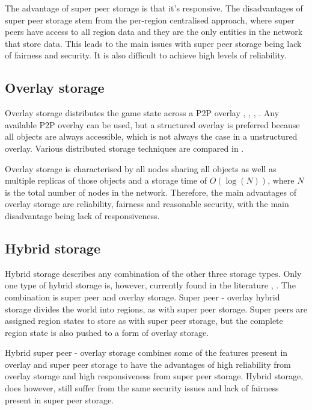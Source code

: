\documentclass[10pt,a4paper,conference]{IEEEtran}
\begin{document}
The advantage of super peer storage is that it's responsive. The disadvantages of super peer storage stem from the per-region centralised approach,
where super peers have access to all region data and they are the only entities in the network that store data. This leads to the main issues with
super peer storage being lack of fairness and security. It is also difficult to achieve high levels of reliability.

\subsection{Overlay storage}

Overlay storage distributes the game state across a P2P overlay \cite{Douglas05enablingmassively}, \cite{using_freenet_storage}, \cite{Fan_phd},
\cite{past_storage_focus}. Any available P2P overlay can be used, but a structured overlay is preferred because all objects are always accessible,
which is not always the case in a unstructured overlay. Various distributed storage techniques are compared in
\cite{Hasan_distributed_storage_survey}.

Overlay storage is characterised by all nodes sharing all objects as well as multiple replicas of those objects and a storage time of $O(\log(N))$,
where $N$ is the total number of nodes in the network. Therefore, the main advantages of overlay storage are reliability, fairness and reasonable
security, with the main disadvantage being lack of responsiveness.

\subsection{Hybrid storage}

Hybrid storage describes any combination of the other three storage types. Only one type of hybrid storage is, however, currently found in the
literature \cite{zoned_federation}, \cite{hybrid_storage1}. The combination is super peer and overlay storage. Super peer - overlay hybrid storage
divides the world into regions, as with super peer storage. Super peers are assigned region states to store as with super peer storage, but the
complete region state is also pushed to a form of overlay storage.

Hybrid super peer - overlay storage combines some of the features present in overlay and super peer storage to have the advantages of high
reliability from overlay storage and high responsiveness from super peer storage. Hybrid storage, does however, still suffer from the same security
issues and lack of fairness present in super peer storage.
\end{document}
